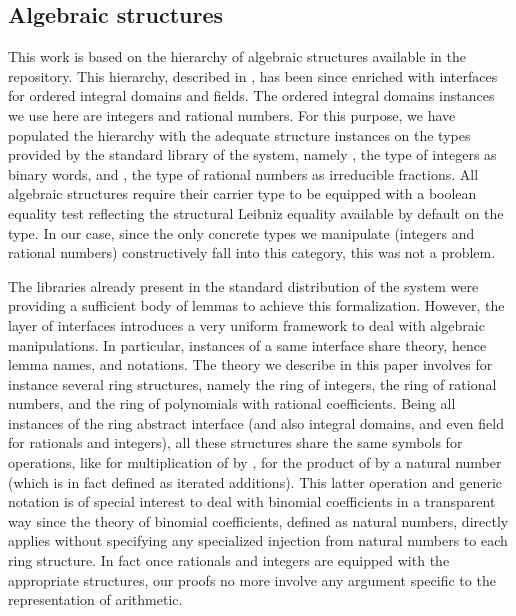 \documentclass{mscs}
\begin{document}
\subsection{Algebraic structures}

This work is based on the hierarchy of algebraic structures available
in the \ssr{} repository. This hierarchy, described in \cite{hieralg},
has been since enriched with interfaces for ordered integral
domains and fields. The ordered integral domains instances we use here are
integers and rational numbers. For this purpose, we have populated the
hierarchy with the adequate structure instances on the types provided
by the standard library of the \Coq{} system, namely , the type
of integers as binary words, and , the type of rational numbers
as irreducible fractions. All \ssr{} algebraic
structures require their carrier type to be equipped with a boolean
equality test reflecting the structural Leibniz equality available by
default on the type. In our case, since the only concrete types
we manipulate (integers and rational numbers) constructively fall into
this category, this was not a problem.

The libraries already present in the standard distribution of the
system were providing a sufficient body of lemmas to achieve this
formalization. However, the \ssr{} layer of interfaces introduces a very
uniform framework to deal with algebraic manipulations.   In particular,
instances of a same interface share theory, hence lemma names, and
notations.  The theory we describe in this paper involves for instance
several ring structures, namely the ring of integers, the ring
of rational numbers, and the ring of polynomials with rational
coefficients. Being all instances of the ring abstract interface
(and also integral domains, and even field for rationals and integers), all
these structures share the same symbols for operations, like
 for multiplication of  by ,  for the
product of  by a natural number (which is in fact defined as
iterated additions).
This latter operation and generic notation is of special interest to
deal with binomial coefficients in a transparent way since the theory
of binomial coefficients, defined as natural numbers, directly applies
without specifying any specialized injection from natural numbers to
each ring structure. In fact once rationals and integers are equipped
with the appropriate structures, our proofs no more involve any
argument specific to the representation of arithmetic.
\end{document}
